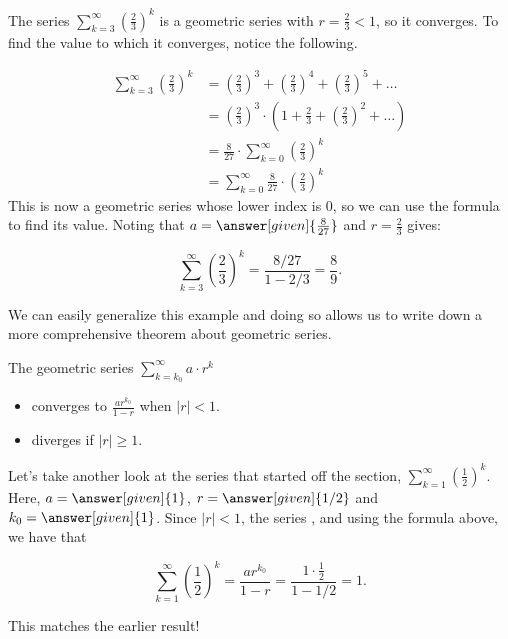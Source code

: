 \documentclass{ximera}
\begin{document}
\begin{example}
The series $\sum_{k=3}^{\infty} \left(\frac{2}{3}\right)^k$ is a geometric series with $r=\frac{2}{3}<1$, so it converges.  To find the value to which it converges, notice the following.

\begin{align*}
\sum_{k=3}^{\infty} \left(\frac{2}{3}\right)^k &=  \left(\frac{2}{3}\right)^3+ \left(\frac{2}{3}\right)^4+ \left(\frac{2}{3}\right)^5+\ldots \\
&= \left(\frac{2}{3}\right)^3 \cdot \left(1+ \frac{2}{3}+ \left(\frac{2}{3}\right)^2+\ldots\right) \\
&= \frac{8}{27}  \cdot  \sum_{k=0}^{\infty}\left(\frac{2}{3}\right)^k \\
&= \sum_{k=0}^{\infty} \frac{8}{27}  \cdot \left(\frac{2}{3}\right)^k
\end{align*}
This is now a geometric series whose lower index is $0$, so we can use the formula to find its value. Noting that $a=\answer[given]{ \frac{8}{27} }$ and $r= \frac{2}{3}$ gives:

\[
\sum_{k=3}^{\infty} \left(\frac{2}{3}\right)^k = \frac{8/27}{1-2/3} = \frac{8}{9}.
\]
\end{example}

We can easily generalize this example and doing so allows us to write down a more comprehensive theorem about geometric series.

\begin{theorem}
  The geometric series $\sum_{k= k_0}^\infty a \cdot r^k$ 
  
  \begin{itemize} 
  \item converges to $\frac{ar^{k_0}}{1-r}$ when $|r| < 1$.
  \item diverges if $|r| \geq 1$.  
  \end{itemize}
  \end{theorem}
 
\begin{example}
Let's take another look at the series that started off the section, $\sum_{k=1}^{\infty} \left(\frac{1}{2}\right)^k$.  Here, $a=\answer[given]{1}$, $r=\answer[given]{1/2}$ and $k_0 = \answer[given]{1}$.  Since $|r|<1$, the series , and using the formula above, we have that

\[ \sum_{k=1}^{\infty} \left(\frac{1}{2}\right)^k = \frac{ar^{k_0}}{1-r} = \frac{1\cdot \frac{1}{2}}{1-1/2} =1.\]

This matches the earlier result!  
\end{example}
\end{document}
